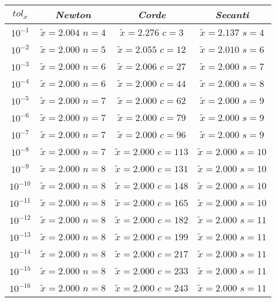 \begin{small}
\begin{center}
	\begin{tabular}{|c|c|c|c|}
		\hline
			$tol_x$ & \textit{Newton} & \textit{Corde} & \textit{Secanti} \\
		\hline
			$10^{-1}$ & $\tilde{x} = 2.004$ \quad $n = 4$ & $\tilde{x} = 2.276$ \quad $c = 3$ & $\tilde{x} = 2.137$ \quad $s = 4$\\
			$10^{-2}$ & $\tilde{x} = 2.000$ \quad $n = 5$ & $\tilde{x} = 2.055$ \quad $c = 12$ & $\tilde{x} = 2.010$ \quad $s = 6$\\
			$10^{-3}$ & $\tilde{x} = 2.000$ \quad $n = 6$ & $\tilde{x} = 2.006$ \quad $c = 27$ & $\tilde{x} = 2.000$ \quad $s = 7$\\
			$10^{-4}$ & $\tilde{x} = 2.000$ \quad $n = 6$ & $\tilde{x} = 2.000$ \quad $c = 44$ & $\tilde{x} = 2.000$ \quad $s = 8$\\
			$10^{-5}$ & $\tilde{x} = 2.000$ \quad $n = 7$ & $\tilde{x} = 2.000$ \quad $c = 62$ & $\tilde{x} = 2.000$ \quad $s = 9$\\
			$10^{-6}$ & $\tilde{x} = 2.000$ \quad $n = 7$ & $\tilde{x} = 2.000$ \quad $c = 79$ & $\tilde{x} = 2.000$ \quad $s = 9$\\
			$10^{-7}$ & $\tilde{x} = 2.000$ \quad $n = 7$ & $\tilde{x} = 2.000$ \quad $c = 96$ & $\tilde{x} = 2.000$ \quad $s = 9$\\
			$10^{-8}$ & $\tilde{x} = 2.000$ \quad $n = 7$ & $\tilde{x} = 2.000$ \quad $c = 113$ & $\tilde{x} = 2.000$ \quad $s = 10$\\
			$10^{-9}$ & $\tilde{x} = 2.000$ \quad $n = 8$ & $\tilde{x} = 2.000$ \quad $c = 131$ & $\tilde{x} = 2.000$ \quad $s = 10$\\
			$10^{-10}$ & $\tilde{x} = 2.000$ \quad $n = 8$ & $\tilde{x} = 2.000$ \quad $c = 148$ & $\tilde{x} = 2.000$ \quad $s = 10$\\
			$10^{-11}$ & $\tilde{x} = 2.000$ \quad $n = 8$ & $\tilde{x} = 2.000$ \quad $c = 165$ & $\tilde{x} = 2.000$ \quad $s = 10$\\
			$10^{-12}$ & $\tilde{x} = 2.000$ \quad $n = 8$ & $\tilde{x} = 2.000$ \quad $c = 182$ & $\tilde{x} = 2.000$ \quad $s = 11$\\
			$10^{-13}$ & $\tilde{x} = 2.000$ \quad $n = 8$ & $\tilde{x} = 2.000$ \quad $c = 199$ & $\tilde{x} = 2.000$ \quad $s = 11$\\
			$10^{-14}$ & $\tilde{x} = 2.000$ \quad $n = 8$ & $\tilde{x} = 2.000$ \quad $c = 217$ & $\tilde{x} = 2.000$ \quad $s = 11$\\
			$10^{-15}$ & $\tilde{x} = 2.000$ \quad $n = 8$ & $\tilde{x} = 2.000$ \quad $c = 233$ & $\tilde{x} = 2.000$ \quad $s = 11$\\
			$10^{-16}$ & $\tilde{x} = 2.000$ \quad $n = 8$ & $\tilde{x} = 2.000$ \quad $c = 243$ & $\tilde{x} = 2.000$ \quad $s = 11$\\
		\hline
	\end{tabular}
\end{center}
\end{small}
